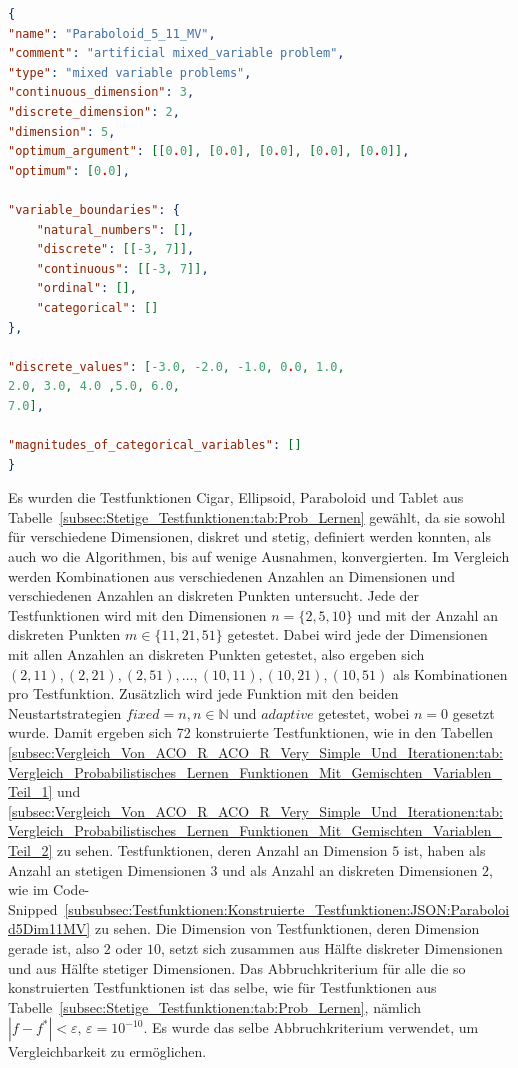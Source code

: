 \documentclass[fontsize=12, a4aper]{scrartcl}
\begin{document}
	\begin{lstlisting}[language=json, caption=Paraboloid 5 Dim gemischte Variablen, label=subsubsec:Testfunktionen:Konstruierte_Testfunktionen:JSON:Paraboloid5Dim11MV]
{
"name": "Paraboloid_5_11_MV",
"comment": "artificial mixed_variable problem",
"type": "mixed variable problems",
"continuous_dimension": 3,
"discrete_dimension": 2,
"dimension": 5,
"optimum_argument": [[0.0], [0.0], [0.0], [0.0], [0.0]],
"optimum": [0.0],

"variable_boundaries": {
	"natural_numbers": [],
	"discrete": [[-3, 7]],
	"continuous": [[-3, 7]],
	"ordinal": [],
	"categorical": []
},

"discrete_values": [-3.0, -2.0, -1.0, 0.0, 1.0,
2.0, 3.0, 4.0 ,5.0, 6.0,
7.0],

"magnitudes_of_categorical_variables": []
}
	\end{lstlisting}
	
	Es wurden die Testfunktionen \glqq Cigar\grqq, \glqq Ellipsoid\grqq, \glqq Paraboloid\grqq{} und \glqq Tablet\grqq{} aus Tabelle~\ref{subsec:Stetige_Testfunktionen:tab:Prob_Lernen} gewählt, da sie sowohl für verschiedene Dimensionen, diskret und stetig, definiert werden konnten, als auch wo die Algorithmen, bis auf wenige Ausnahmen, konvergierten. Im Vergleich werden Kombinationen aus verschiedenen Anzahlen an Dimensionen und verschiedenen Anzahlen an diskreten Punkten untersucht. Jede der Testfunktionen wird mit den Dimensionen \(n = \{2, 5, 10\}\) und mit der Anzahl an diskreten Punkten \(m \in \{11, 21, 51\}\) getestet. Dabei wird jede der Dimensionen mit allen Anzahlen an diskreten Punkten getestet, also ergeben sich \((2,11), (2,21), (2,51), \dots, (10, 11), (10,21), (10,51)\) als Kombinationen pro Testfunktion. Zusätzlich wird jede Funktion mit den beiden Neustartstrategien \(fixed = n, n \in \mathbb{N}\) und \(adaptive\) getestet, wobei \(n = 0\) gesetzt wurde. Damit ergeben sich 72 konstruierte Testfunktionen, wie in den Tabellen \ref{subsec:Vergleich_Von_ACO_R_ACO_R_Very_Simple_Und_Iterationen:tab:Vergleich_Probabilistisches_Lernen_Funktionen_Mit_Gemischten_Variablen_Teil_1} und \ref{subsec:Vergleich_Von_ACO_R_ACO_R_Very_Simple_Und_Iterationen:tab:Vergleich_Probabilistisches_Lernen_Funktionen_Mit_Gemischten_Variablen_Teil_2} zu sehen. Testfunktionen, deren Anzahl an Dimension \(5\) ist, haben als Anzahl an stetigen Dimensionen \(3\) und als Anzahl an diskreten Dimensionen \(2\), wie im Code-Snipped~\ref{subsubsec:Testfunktionen:Konstruierte_Testfunktionen:JSON:Paraboloid5Dim11MV} zu sehen. Die Dimension von Testfunktionen, deren Dimension gerade ist, also \(2\) oder \(10\), setzt sich zusammen aus Hälfte diskreter Dimensionen und aus Hälfte stetiger Dimensionen. Das Abbruchkriterium für alle die so konstruierten Testfunktionen ist das selbe, wie für Testfunktionen aus Tabelle~\ref{subsec:Stetige_Testfunktionen:tab:Prob_Lernen}, nämlich \(|f - f^*| < \varepsilon, \, \varepsilon = 10^{-10}\). Es wurde das selbe Abbruchkriterium verwendet, um Vergleichbarkeit zu ermöglichen.
	
\end{document}
